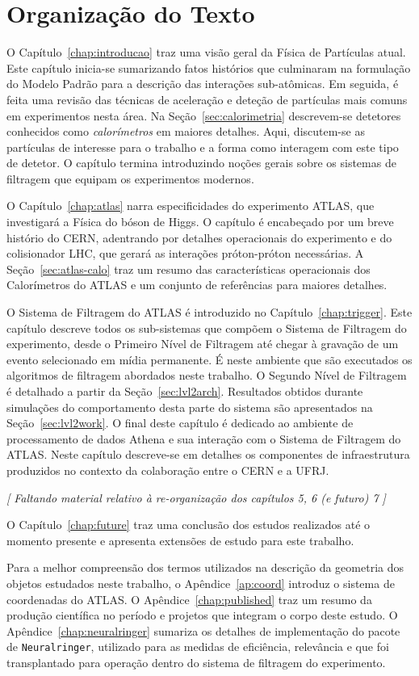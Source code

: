 \section{Organização do Texto}

O Capítulo~\ref{chap:introducao} traz uma visão geral da Física de Partículas
atual. Este capítulo inicia-se sumarizando fatos histórios que culminaram na
formulação do Modelo Padrão para a descrição das interações sub-atômicas. Em
seguida, é feita uma revisão das técnicas de aceleração e deteção de
partículas mais comuns em experimentos nesta área. Na
Seção~\ref{sec:calorimetria} descrevem-se detetores conhecidos como 
\textit{calorímetros} em maiores detalhes. Aqui, discutem-se as partículas de
interesse para o trabalho e a forma como interagem com este tipo de detetor. O
capítulo termina introduzindo noções gerais sobre os sistemas de filtragem que
equipam os experimentos modernos.

O Capítulo~\ref{chap:atlas} narra especificidades do experimento ATLAS, que
investigará a Física do bóson de Higgs. O capítulo é encabeçado por um breve
histório do CERN, adentrando por detalhes operacionais do experimento e do
colisionador LHC, que gerará as interações próton-próton necessárias. A
Seção~\ref{sec:atlas-calo} traz um resumo das características operacionais dos
Calorímetros do ATLAS e um conjunto de referências para maiores detalhes.

O Sistema de Filtragem do ATLAS é introduzido no
Capítulo~\ref{chap:trigger}. Este capítulo descreve todos os sub-sistemas que
compõem o Sistema de Filtragem do experimento, desde o Primeiro Nível de
Filtragem até chegar à gravação de um evento selecionado em mídia
permanente. É neste ambiente que são executados os algoritmos de filtragem
abordados neste trabalho. O Segundo Nível de Filtragem é detalhado a partir da
Seção~\ref{sec:lvl2arch}. Resultados obtidos durante simulações do
comportamento desta parte do sistema são apresentados na
Seção~\ref{sec:lvl2work}. O final deste capítulo é dedicado ao ambiente de
processamento de dados Athena e sua interação com o Sistema de Filtragem do
ATLAS. Neste capítulo descreve-se em detalhes os componentes de infraestrutura
produzidos no contexto da colaboração entre o CERN e a UFRJ.

\textit{[ Faltando material relativo à re-organização dos capítulos 5, 6 (e futuro) 7 ]}

O Capítulo~\ref{chap:future} traz uma conclusão dos estudos realizados
até o momento presente e apresenta extensões de estudo para este trabalho.

Para a melhor compreensão dos termos utilizados na descrição da geometria dos
objetos estudados neste trabalho, o Apêndice~\ref{ap:coord} introduz o sistema
de coordenadas do ATLAS. O Apêndice~\ref{chap:published} traz um resumo da
produção científica no período e projetos que integram o corpo deste estudo. O
Apêndice~\ref{chap:neuralringer} sumariza os detalhes de implementação do
pacote de  \texttt{Neuralringer}, utilizado para as medidas de
eficiência, relevância e que foi transplantado para operação dentro do sistema
de filtragem do experimento.

